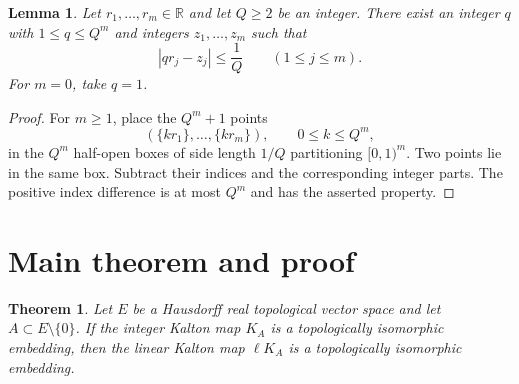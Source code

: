 \documentclass[11pt]{article}
\newtheorem{theorem}{Theorem}
\newtheorem{lemma}{Lemma}
\newcommand{\R}{\mathbb{R}}
\newcommand{\KA}{K_A}
\newcommand{\lKA}{\ell K_A}
\begin{document}
\begin{lemma}\label{lem:dirichlet}
Let $r_1,\ldots,r_m\in\R$ and let $Q\ge 2$ be an integer. There exist an
integer $q$ with $1\le q\le Q^m$ and integers $z_1,\ldots,z_m$ such that
\[
   |q r_j-z_j|\le \frac1Q\qquad(1\le j\le m).
\]
For $m=0$, take $q=1$.
\end{lemma}

\begin{proof}
For $m\ge1$, place the $Q^m+1$ points
\[
  (\{k r_1\},\ldots,\{k r_m\}),\qquad 0\le k\le Q^m,
\]
in the $Q^m$ half-open boxes of side length $1/Q$ partitioning
$[0,1)^m$. Two points lie in the same box. Subtract their indices and the
corresponding integer parts. The positive index difference is at most $Q^m$
and has the asserted property.
\end{proof}

\section{Main theorem and proof}

\begin{theorem}\label{thm:main}
Let $E$ be a Hausdorff real topological vector space and let
$A\subset E\setminus\{0\}$. If the integer Kalton map $\KA$ is a
topologically isomorphic embedding, then the linear Kalton map $\lKA$ is a
topologically isomorphic embedding.
\end{theorem}
\end{document}
